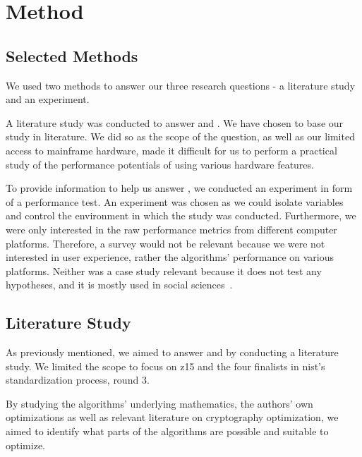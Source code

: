 \chapter{Method}
\label{chapter:method}

\section{Selected Methods}
\label{section:method:selected-method}

We used two methods to answer our three research questions - a literature study and an experiment.

A literature study was conducted to answer  and . We have chosen to base our study in literature. We did so as the scope of the question, as well as our limited access to mainframe hardware, made it difficult for us to perform a practical study of the performance potentials of using various hardware features.

To provide information to help us answer , we conducted an experiment in form of a performance test. An experiment was chosen as we could isolate variables and control the environment in which the study was conducted. Furthermore, we were only interested in the raw performance metrics from different computer platforms. Therefore, a survey would not be relevant because we were not interested in user experience, rather the algorithms' performance on various platforms. Neither was a case study relevant because it does not test any hypotheses, and it is mostly used in social sciences~\cite{wohlin2012}.

\section{Literature Study}
\label{section:method:literature-study}

As previously mentioned, we aimed to answer  and  by conducting a literature study. We limited the scope to focus on \gls{z15} and the four finalists in \gls{nist}'s standardization process, round 3.

By studying the algorithms' underlying mathematics, the authors' own optimizations as well as relevant literature on cryptography optimization, we aimed to identify what parts of the algorithms are possible and suitable to optimize.


